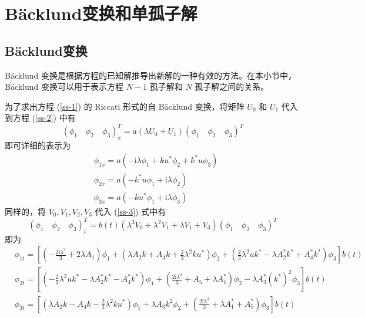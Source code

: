 \section{B\"acklund变换和单孤子解}
\subsection{B\"acklund变换}
B\"acklund 变换是根据方程的已知解推导出新解的一种有效的方法。在本小节中，B\"acklund 变换可以用于表示方程 $N - 1$ 孤子解和 $N$ 孤子解之间的关系。

为了求出方程 (\ref{ss-1}) 的 Riccati 形式的自 B\"{a}cklund 变换，将矩阵 $U_0$ 和 $U_1$ 代入到方程 (\ref{ss-2}) 中有
\begin{equation}
  (\phi_{1}\quad \phi_{2}\quad \phi_{3})_{x}^{T} = a(\lambda U_{0} + U_{1})(\phi_{1}\quad \phi_{2}\quad \phi_{3})^{T}
\end{equation}
即可详细的表示为
\begin{align}
  & \phi_{1x} = a(-\mathrm{i}\lambda\phi_{1} + ku^{*}\phi_{2} +k^{*}u\phi_{3}) \label{ss-p1}\\
  & \phi_{2x} = a(-k^{*}u\phi_{1} + \mathrm{i}\lambda\phi_{2}) \\
  & \phi_{3x} = a(-ku^{*}\phi_{1} + \mathrm{i}\lambda\phi_{3}) \label{ss-p2}
\end{align}
同样的，将 $V_{0}, V_{1}, V_{2}, V_{3}$ 代入 (\ref{ss-3}) 式中有
\begin{equation}
  (\phi_{1}\quad \phi_{2} \quad \phi_{3})^{T}_{t} = b(t)(\lambda^{3}V_{0} + \lambda^{2}V_{1} + \lambda V_{1} + V_{3})(\phi_{1}\quad \phi_{2} \quad \phi_{3})^{T}
\end{equation}
即为
\begin{align}
  & \phi_{1t} = \left[\left(-\frac{2\mathrm{i}\lambda^{3}}{3}+2\lambda A_{1}\right)\phi_{1} + \left(\lambda A_{2}k+A_{4}k+\frac{2}{3}\lambda^{2}ku^{*}\right)\phi_{2} + \left(\frac{2}{3}\lambda^{2}uk^{*}-\lambda A_{2}^{*}k^{*}+A_{4}^{*}k^{*}\right)\phi_{3}\right]b(t) \label{ss-p3} \\
  & \phi_{2t} = \left[\left(-\frac{2}{3}\lambda^{2}uk^{*}-\lambda A_{2}^{*}k^{*}-A_{4}^{*}k^{*}\right)\phi_{1} + \left(\frac{2\mathrm{i}\lambda^{3}}{3}+A_{5}+\lambda A_{1}^{*}\right)\phi_{2} - \lambda A_{3}^{*}(k^{*})^{2}\phi_{3}\right]b(t) \\
  & \phi_{3t} = \left[\left(\lambda A_{2}k-A_{4}k-\frac{2}{3}\lambda^{2}ku^{*}\right)\phi_{1} + \lambda A_{3}k^{2}\phi_{2} + \left(\frac{2\mathrm{i}\lambda^{3}}{3}+\lambda A_{1}^{*} + A_{5}^{*}\right)\phi_{3}\right]b(t) \label{ss-p4}
\end{align}
